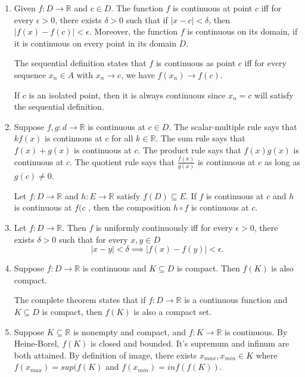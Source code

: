 \documentclass[12pt]{article}
\begin{document}
\begin{enumerate}[label=(\alph*)]
    \item Given \(f: D \to \mathbb{R} \) and \( c\in D\). The function \(f\) is continuous at point \(c\) iff for every \(\epsilon > 0\), there exists \(\delta >0\) such that if \( | x - c | < \delta \), then \( |f(x) - f(c) | < \epsilon \). Moreover, the function \(f\) is continuous on its domain, if it is continuous on every point in its domain \(D\).

          The sequential definition states that \(f\) is continuous as point \(c\) iff for every sequence \( x_n \in A\) with \( x_n \to c \), we have \( f(x _n) \to f(c) \).

          If \(c\) is an isolated point, then it is always continuous since \( x_n = c \) will satisfy the sequential definition.

    \item Suppose \( f,g : d \to \mathbb{R} \) is continuous at \( c \in D\).
          The scalar-multiple rule says that \(k f(x) \) is continuous at \(c\) for all \( k \in \mathbb{R} \). The sum rule says that \( f(x) + g(x) \) is continuous at \(c\). The product rule says that \(f(x)g(x)\) is continuous at \(c\). The quotient rule says that
          \(\frac{f(x)}{g(x)}\) is continuous at \(c\) as long as \(g(c) \neq 0\).

          Let \(f: D \to \mathbb{R} \) and \(h: E \to \mathbb{R} \) satisfy \(f(D) \subseteq E\).
          If \(f\) is continuous at \(c\) and \(h\) is continuous at \(f(c\) , then the composition \(h \circ f\) is continuous at \(c\).

    \item Let \(f: D \to \mathbb{R} \). Then \(f\) is uniformly continuously iff for every \(\epsilon > 0\), there exists \(\delta > 0\) such that for every \(x,y \in D\)
          \[
              | x - y | < \delta \implies |f(x) -f(y) | < \epsilon.
          \]

    \item Suppose \(f: D \to \mathbb{R} \) is continuous and \(K \subseteq D\) is compact. Then \(f(K)\) is also compact.

          The complete theorem states that if \(f: D \to \mathbb{R} \) is a continuous function and \(K \subseteq D\) is compact, then \(f(K)\) is also a compact set.

    \item Suppose \(K\subseteq\mathbb R\) is nonempty and compact, and \(f:K\to\mathbb R\) is continuous. By Heine-Borel, \(f(K)\) is closed and bounded. It's supremum and infinum are both attained. By definition of image, there exists \(x_{max}, x_{min} \in K\) where \(f(x_{max}) = sup(f(K) \) and \(f(x_{min}) = inf(f(K))\).


\end{enumerate}
\end{document}
